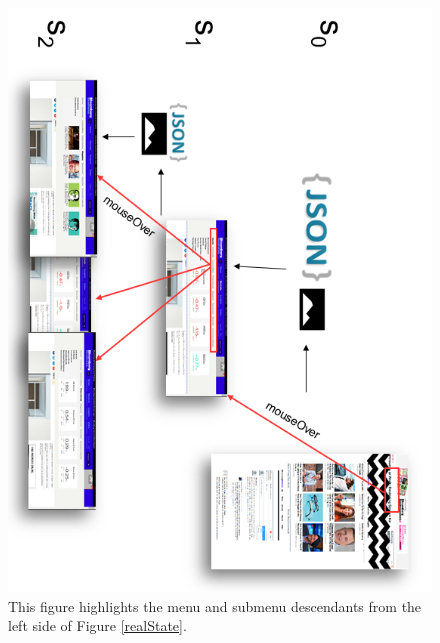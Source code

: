 \documentclass{sig-alternate}
\begin{document}
\begin{figure}
\centering
\includegraphics[height=0.98\textheight]{./imgs/realStates_leftH.png}
\caption{This figure highlights the menu and submenu descendants from the left side of Figure \ref{realState}.}
\label{realStateL}
\end{figure}
\end{document}
